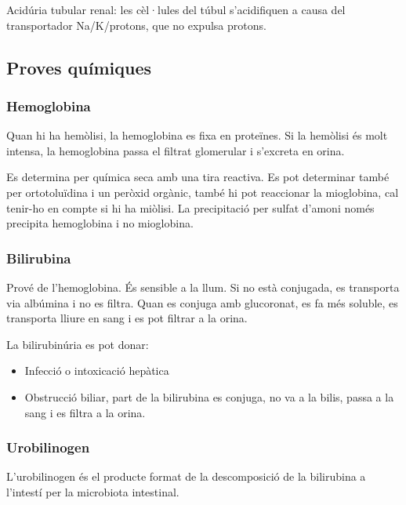 
Acidúria tubular renal: les cèl·lules del túbul s'acidifiquen a causa
del transportador Na/K/protons, que no expulsa protons.


\subsection{Proves químiques}
\label{sec:proves-quimiques}

\subsubsection{Hemoglobina}
\label{sec:hemoglobina}

Quan hi ha hemòlisi, la hemoglobina es fixa en proteïnes. Si la
hemòlisi és molt intensa, la hemoglobina passa el filtrat glomerular i
s'excreta en orina.

Es determina per química seca amb una tira reactiva. Es pot determinar
també per ortotoluïdina i un peròxid orgànic, també hi pot reaccionar
la mioglobina, cal tenir-ho en compte si hi ha miòlisi. La
precipitació per sulfat d'amoni només precipita hemoglobina i no
mioglobina.

\subsubsection{Bilirubina}
\label{sec:bilirubina}

Prové de l'hemoglobina. És sensible a la llum. Si no està conjugada,
es transporta via albúmina i no es filtra. Quan es conjuga amb
glucoronat, es fa més soluble, es transporta lliure en sang i es pot
filtrar a la orina.

La bilirubinúria es pot donar:
\begin{itemize}
\item Infecció o intoxicació hepàtica
\item Obstrucció biliar, part de la bilirubina es conjuga, no va a la
  bilis, passa a la sang i es filtra a la orina.
\end{itemize}

\subsubsection{Urobilinogen}
\label{sec:urobilinogen}

L'urobilinogen és el producte format de la descomposició de la
bilirubina a l'intestí per la microbiota intestinal.

